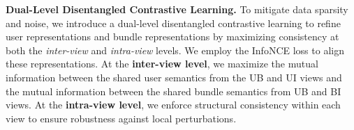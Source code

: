 \documentclass[lettersize,journal]{IEEEtran}
\begin{document}



\noindent \textbf{Dual-Level Disentangled Contrastive Learning.}
To mitigate data sparsity and noise, we introduce a dual-level disentangled contrastive learning to refine user representations and bundle representations by maximizing consistency at both the \textit{inter-view} and \textit{intra-view} levels. We employ the InfoNCE loss to align these representations. At the \textbf{inter-view level}, we maximize the mutual information between the shared user semantics from the UB and UI views and the mutual information between the shared bundle semantics from UB and BI views. At the \textbf{intra-view level}, we enforce structural consistency within each view to ensure robustness against local perturbations.
\end{document}
